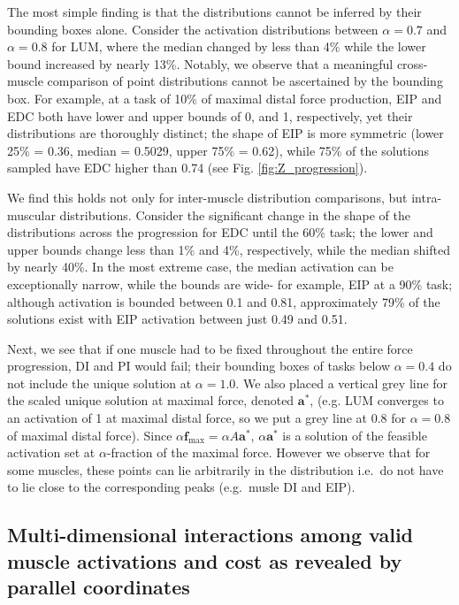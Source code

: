 The most simple finding is that the distributions cannot be inferred by their bounding boxes alone.
Consider the activation distributions between $\alpha = 0.7$ and $\alpha = 0.8$ for LUM, where the median changed by less than 4\% while the lower bound increased by nearly 13\%.
Notably, we observe that a meaningful cross-muscle comparison of point distributions cannot be ascertained by the bounding box. For example, at a task of 10\% of maximal distal force production, EIP and EDC both have lower and upper bounds of 0, and 1, respectively, yet their distributions are thoroughly distinct; the shape of EIP is more symmetric (lower 25\% = 0.36, median = 0.5029, upper 75\% = 0.62), while 75\% of the solutions sampled have EDC higher than 0.74 (see Fig. \ref{fig:Z_progression}).

We find this holds not only for inter-muscle distribution comparisons, but intra-muscular distributions. Consider the significant change in the shape of the distributions across the progression for EDC until the 60\% task; the lower and upper bounds change less than 1\% and 4\%, respectively, while the median shifted by nearly 40\%.
In the most extreme case, the median activation can be exceptionally narrow, while the bounds are wide- for example, EIP at a 90\% task; although activation is bounded between 0.1 and 0.81, approximately 79\% of the solutions exist with EIP activation between just 0.49 and 0.51.

Next, we see that if one muscle had to be fixed throughout the entire force progression, DI and PI would fail; their bounding boxes of tasks below $\alpha=0.4$ do not include the unique solution at $\alpha=1.0$.
We also placed a vertical grey line for the scaled unique solution at maximal force, denoted $\textbf{a}^*$, (e.g. LUM converges to an activation of 1 at maximal distal force, so we put a grey line at 0.8 for $\alpha=0.8$ of maximal distal force).
Since $\alpha \textbf{f}_{\max} = \alpha A \textbf{a}^*$, $\alpha \textbf{a}^*$ is a solution of the feasible activation set at $\alpha$-fraction of the maximal force.
However we observe that for some muscles, these points can lie arbitrarily in the distribution i.e.\ do not have to lie close to the corresponding peaks (e.g.\ musle DI and EIP).

\subsection*{Multi-dimensional interactions among valid muscle activations and cost as revealed by parallel coordinates}

